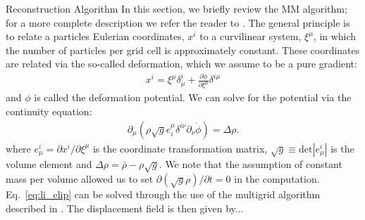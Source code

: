 \begin{section}{Reconstruction Algorithm}
  \label{sec:reconstruction}
  In this section, we briefly review the MM algorithm; for a more
  complete description we refer the reader to \cite{bib:Zhu2016}.  The
  general principle is to relate a particles Eulerian coordinates, $x^i$ to
  a curvilinear system, $\xi^\mu$, in which the number of particles
  per grid cell is approximately constant.  These coordinates are
  related via the so-called deformation, which we assume to be a pure
  gradient:
  \begin{align}
    x^i = \xi^\mu \delta^i_\mu + \frac{\partial \phi}{\partial
    \xi^\mu}\delta^{i\mu}
  \end{align}
  and $\phi$ is called the deformation potential.  We can solve for
  the potential via the continuity equation:
  \begin{align}
    \label{eq:li_elip}
    \partial _\mu (\rho \sqrt{g} e^\mu _i \delta^{i\nu}
    \partial_\nu \dot{\phi})=\Delta \rho.
  \end{align}
  where $e^i_\mu = \partial x^i / \partial \xi ^ \mu$ is the
  coordinate transformation matrix,
  $\sqrt{g} \equiv \mathrm{det}\left| e^i_\mu\right|$ is the volume
  element and $\Delta \rho = \bar{\rho}-\rho \sqrt{g}$.  We note that
  the assumption of constant mass per volume allowed us to set
  $\partial(\sqrt{g}\rho)/\partial t = 0$ in the computation.
  Eq.~\ref{eq:li_elip} can be solved through the use of the multigrid
  algorithm described in \cite{bib:Pen1995,bib:Pen1998,bib:ZhuH2016}.
  The displacement field is then given by...

\end{section}


